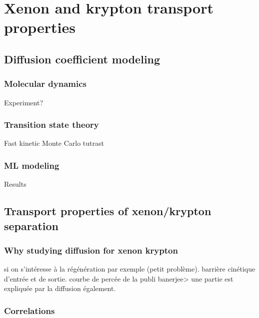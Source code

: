 \documentclass[main]{subfiles}
\begin{document}
\chapter{Xenon and krypton transport properties}
\vspace*{-1\baselineskip}

\section{Diffusion coefficient modeling}

\subsection{Molecular dynamics}

Experiment? 

\subsection{Transition state theory}



Fast kinetic Monte Carlo
tutrast\autocite{Mace_2019}

\subsection{ML modeling}

Results

\section{Transport properties of xenon/krypton separation}

\subsection{Why studying diffusion for xenon krypton}

si on s'intéresse à la régénération par exemple (petit problème). barrière cinétique d'entrée et de sortie.
courbe de percée de la publi banerjee> une partie est expliquée par la diffusion également.

\subsection{Correlations}
\end{document}
